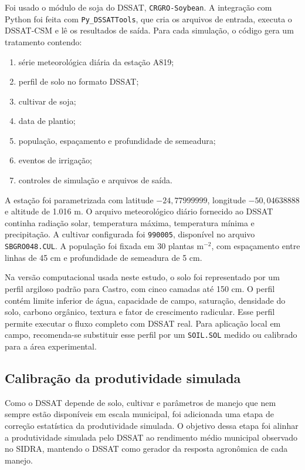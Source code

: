Foi usado o módulo de soja do DSSAT, \texttt{CRGRO-Soybean}. A integração com
Python foi feita com \texttt{Py\_DSSATTools}, que cria os arquivos de entrada,
executa o DSSAT-CSM e lê os resultados de saída. Para cada simulação, o código
gera um tratamento contendo:
\begin{enumerate}
    \item série meteorológica diária da estação A819;
    \item perfil de solo no formato DSSAT;
    \item cultivar de soja;
    \item data de plantio;
    \item população, espaçamento e profundidade de semeadura;
    \item eventos de irrigação;
    \item controles de simulação e arquivos de saída.
\end{enumerate}

A estação foi parametrizada com latitude $-24{,}77999999$, longitude
$-50{,}04638888$ e altitude de 1.016 m. O arquivo meteorológico diário fornecido
ao DSSAT continha radiação solar, temperatura máxima, temperatura mínima e
precipitação. A cultivar configurada foi \texttt{990005}, disponível no arquivo
\texttt{SBGRO048.CUL}. A população foi fixada em 30 plantas m$^{-2}$, com
espaçamento entre linhas de 45 cm e profundidade de semeadura de 5 cm.

Na versão computacional usada neste estudo, o solo foi representado por um perfil
argiloso padrão para Castro, com cinco camadas até 150 cm. O perfil contém limite
inferior de água, capacidade de campo, saturação, densidade do solo, carbono
orgânico, textura e fator de crescimento radicular. Esse perfil permite executar
o fluxo completo com DSSAT real. Para aplicação local em campo, recomenda-se
substituir esse perfil por um \texttt{SOIL.SOL} medido ou calibrado para a área
experimental.

\subsection{Calibração da produtividade simulada}
\label{subsec:calibracao_dssat}

Como o DSSAT depende de solo, cultivar e parâmetros de manejo que nem sempre
estão disponíveis em escala municipal, foi adicionada uma etapa de correção
estatística da produtividade simulada. O objetivo dessa etapa foi alinhar a
produtividade simulada pelo DSSAT ao rendimento médio municipal observado no
SIDRA, mantendo o DSSAT como gerador da resposta agronômica de cada manejo.

